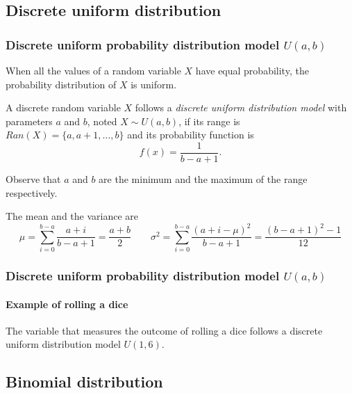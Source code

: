 \subsection{Discrete uniform distribution}

\begin{frame}
\frametitle{Discrete uniform probability distribution model $U(a,b)$}
When all the values of a random variable $X$ have equal probability, the probability distribution of $X$
is uniform.

\begin{definition}
A discrete random variable $X$ follows a \emph{discrete uniform distribution model} with parameters $a$ and $b$, noted 
$X\sim U(a,b)$, if its range is $Ran(X) = \{a, a+1, \ldots,b\}$ and its probability function is
\[f(x)=\frac{1}{b-a+1}.\]
\end{definition}

Observe that $a$ and $b$ are the minimum and the maximum of the range respectively. 

The mean and the variance are
\[
\mu = \sum_{i=0}^{b-a}\frac{a+i}{b-a+1}=\frac{a+b}{2} \qquad \sigma^2 =\sum_{i=0}^{b-a}\frac{(a+i-\mu)^2}{b-a+1}=
\frac{(b-a+1)^2-1}{12}
\]
\end{frame}


\begin{frame}
\frametitle{Discrete uniform probability distribution model $U(a,b)$}
\framesubtitle{Example of rolling a dice}
The variable that measures the outcome of rolling a dice follows a discrete uniform distribution model $U(1,6)$.
\begin{center}
\scalebox{0.65}{}
\end{center} 
\end{frame}


\subsection{Binomial distribution}

